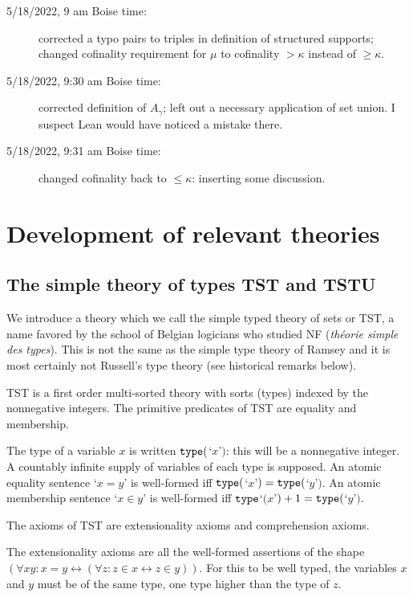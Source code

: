 \documentclass[112pt]{article}
\begin{document}
\begin{description}
\item[5/18/2022, 9 am Boise time:]  corrected a typo pairs to triples in definition of structured supports;  changed cofinality requirement for
$\mu$ to cofinality $>\kappa$ instead of $\geq \kappa$.

\item[5/18/2022, 9:30 am Boise time:]  corrected definition of $A_\gamma$;  left out a necessary application of set union.  I suspect Lean would have noticed a mistake there.

\item[5/18/2022, 9:31 am Boise time:]  changed cofinality back to $\leq \kappa$:  inserting some discussion.

\end{description}


\section{Development of relevant theories}

\subsection{The simple theory of types TST and TSTU}

We introduce a theory which we call the simple typed theory of sets or TST, a name favored by the school of Belgian logicians who studied NF ({\em th\'eorie simple des types}).  This is not the same as the simple type theory of Ramsey and it is most certainly not Russell's type theory  (see historical remarks below).

TST is a first order multi-sorted theory with sorts (types) indexed by the nonnegative integers.  The primitive predicates of TST are equality and membership.

The type of a variable $x$ is written ${\tt type}($`$x$'$)$:  this will be a nonnegative integer.   A countably infinite supply of variables of each type is supposed.  An atomic equality sentence `$x=y$' is well-formed iff ${\tt type}($`$x$'$)={\tt type}($`$y$'$)$.
An atomic membership sentence `$x \in y$' is well-formed iff ${\tt type}$`$(x$'$)+1 = {\tt type}($`$y$'$)$.

The axioms of TST are extensionality axioms and comprehension axioms.

The extensionality axioms are all the well-formed assertions of the shape $(\forall xy:x=y \leftrightarrow (\forall z:z \in x \leftrightarrow z\in y))$.  For this to be well typed, the variables
$x$ and $y$ must be of the same type, one type higher than the type of $z$.
\end{document}

